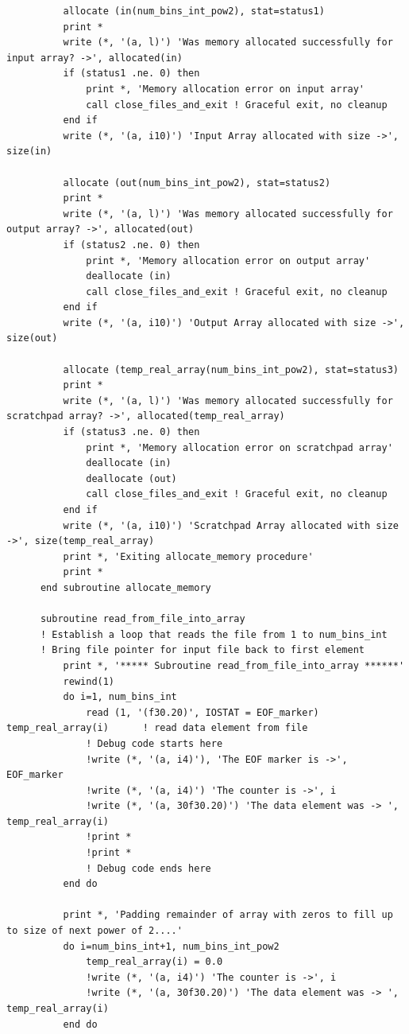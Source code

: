 \begin{verbatim}
          allocate (in(num_bins_int_pow2), stat=status1)
          print *
          write (*, '(a, l)') 'Was memory allocated successfully for input array? ->', allocated(in)  
          if (status1 .ne. 0) then
              print *, 'Memory allocation error on input array'
              call close_files_and_exit	! Graceful exit, no cleanup  
          end if
          write (*, '(a, i10)') 'Input Array allocated with size ->', size(in)
      
          allocate (out(num_bins_int_pow2), stat=status2)
          print *
          write (*, '(a, l)') 'Was memory allocated successfully for output array? ->', allocated(out)  
          if (status2 .ne. 0) then
              print *, 'Memory allocation error on output array'
              deallocate (in)
              call close_files_and_exit	! Graceful exit, no cleanup  
          end if
          write (*, '(a, i10)') 'Output Array allocated with size ->', size(out)
      
          allocate (temp_real_array(num_bins_int_pow2), stat=status3)
          print *
          write (*, '(a, l)') 'Was memory allocated successfully for scratchpad array? ->', allocated(temp_real_array)  
          if (status3 .ne. 0) then
              print *, 'Memory allocation error on scratchpad array'
              deallocate (in)
              deallocate (out)
              call close_files_and_exit	! Graceful exit, no cleanup  
          end if
          write (*, '(a, i10)') 'Scratchpad Array allocated with size ->', size(temp_real_array)
          print *, 'Exiting allocate_memory procedure'
          print *
      end subroutine allocate_memory
        
      subroutine read_from_file_into_array
      ! Establish a loop that reads the file from 1 to num_bins_int
      ! Bring file pointer for input file back to first element 
          print *, '***** Subroutine read_from_file_into_array ******'
          rewind(1)
          do i=1, num_bins_int
              read (1, '(f30.20)', IOSTAT = EOF_marker) temp_real_array(i)		! read data element from file
              ! Debug code starts here
              !write (*, '(a, i4)'), 'The EOF marker is ->', EOF_marker
              !write (*, '(a, i4)') 'The counter is ->', i
              !write (*, '(a, 30f30.20)') 'The data element was -> ', temp_real_array(i)
              !print *
              !print *
              ! Debug code ends here
          end do
      
          print *, 'Padding remainder of array with zeros to fill up to size of next power of 2....'
          do i=num_bins_int+1, num_bins_int_pow2
              temp_real_array(i) = 0.0
              !write (*, '(a, i4)') 'The counter is ->', i
              !write (*, '(a, 30f30.20)') 'The data element was -> ', temp_real_array(i)
          end do
      

\end{verbatim}
